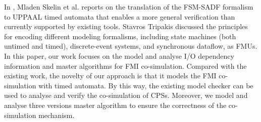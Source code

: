 In \cite{SkelinWOHL15}, Mladen Skelin et al. reports on the translation of the FSM-SADF formalism to UPPAAL timed automata that enables a more general
verification than currently supported by existing tools. Stavros Tripakis \cite{Tripakis15} discussed the principles for encoding different modeling formalisms, including state machines (both untimed and timed), discrete-event systems, and synchronous dataflow, as FMUs. In this paper, our work focuses on the model and analyse I/O dependency information and master algorithms for FMI co-simulation.
Compared with the existing work, the novelty of our approach is that it models the FMI co-simulation with timed automata. By this way, the existing model checker can be used to analyse and verify the co-simulation of CPSs. Moreover, we model and analyse three versions master algorithm to ensure the correctness of the co-simulation mechanism.  


